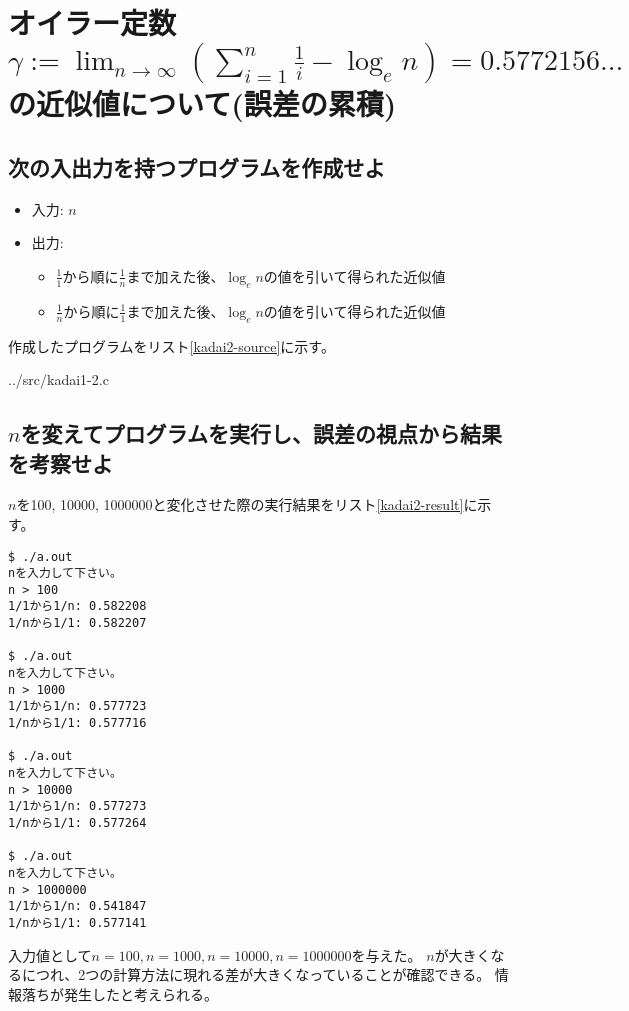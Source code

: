 \documentclass[]{jsarticle}
\begin{document}
\section{オイラー定数$\gamma:=\lim_{n \to \infty} \left(\sum_{i=1}^{n} \frac{1}{i} - \log_{e} n\right)=0.5772156...$の近似値について(誤差の累積)}

\subsection{次の入出力を持つプログラムを作成せよ}

\begin{itemize}
\item 入力: $n$
\item 出力:
\begin{itemize}
\item $\frac{1}{1}$から順に$\frac{1}{n}$まで加えた後、$\log_{e} n$の値を引いて得られた近似値
\item $\frac{1}{n}$から順に$\frac{1}{1}$まで加えた後、$\log_{e} n$の値を引いて得られた近似値
\end{itemize}
\end{itemize}

作成したプログラムをリスト\ref{kadai2-source}に示す。


{../src/kadai1-2.c}

\subsection{$n$を変えてプログラムを実行し、誤差の視点から結果を考察せよ}

$n$を100, 10000, 1000000と変化させた際の実行結果をリスト\ref{kadai2-result}に示す。

\begin{lstlisting}[caption=実行結果,label=kadai2-result]
$ ./a.out
nを入力して下さい。
n > 100
1/1から1/n: 0.582208
1/nから1/1: 0.582207

$ ./a.out
nを入力して下さい。
n > 1000
1/1から1/n: 0.577723
1/nから1/1: 0.577716

$ ./a.out
nを入力して下さい。
n > 10000
1/1から1/n: 0.577273
1/nから1/1: 0.577264

$ ./a.out
nを入力して下さい。
n > 1000000
1/1から1/n: 0.541847
1/nから1/1: 0.577141
\end{lstlisting}

入力値として$n=100, n=1000, n=10000, n=1000000$を与えた。
$n$が大きくなるにつれ、2つの計算方法に現れる差が大きくなっていることが確認できる。
情報落ちが発生したと考えられる。
\end{document}
